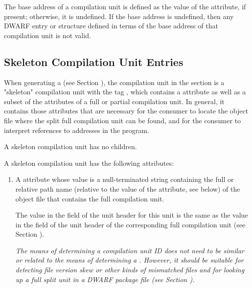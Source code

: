The  base address of a compilation unit is defined as the
value of the \DWATlowpc{} attribute, if present; otherwise,
it is undefined. If the base address is undefined, then any
DWARF entry or structure defined in terms of the base address
of that compilation unit is not valid.

\subsection{Skeleton Compilation Unit Entries}
\label{chap:skeletoncompilationunitentries}
When generating a \splitDWARFobjectfile{} (see 
Section ), the
compilation unit in the \dotdebuginfo{} section is a "skeleton"
compilation unit with the tag 
\DWTAGskeletonunitTARG, which contains a
\DWATdwoname{} attribute as well as a subset of the
attributes of a full or partial compilation unit. In general,
it contains those attributes that are necessary for the consumer
to locate the object file where the split full compilation unit
can be found, and for the consumer to interpret references to
addresses in the program. 

A skeleton compilation unit has no children.

A skeleton compilation unit has 
\bb
the following attributes:
\eb

\begin{enumerate}[1. ]

\item {}
A \DWATdwonameDEFN{} attribute
whose value is a
null-terminated string containing the full or relative
path name (relative to the value of the \DWATcompdir{} attribute, 
see below) of the object file that contains the full
compilation unit.

The value in the \HFNdwoid{} field of the unit header for 
this unit is the same as the value in the \HFNdwoid{} field 
of the unit header of the corresponding full compilation 
unit (see Section ).
        
\textit{The means of determining a compilation unit ID does 
not need to be similar or related to the means of 
determining a \TUsignature. However, it should 
be suitable for detecting file version skew or other 
kinds of mismatched files and for looking up a full
split unit in a DWARF package file 
(see Section ).}

\end{enumerate}

